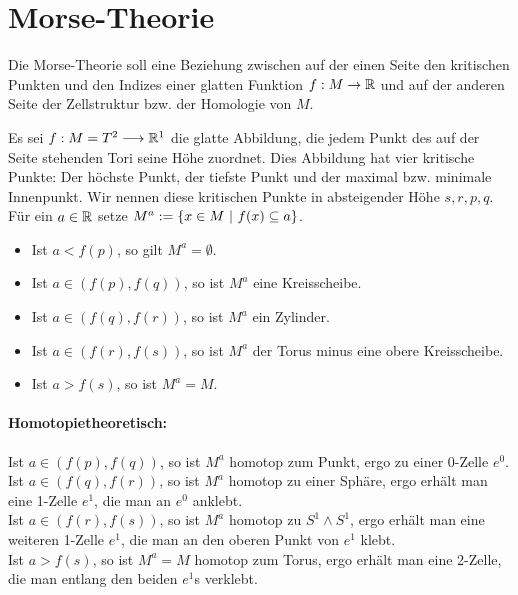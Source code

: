 \newpage
\section{Morse-Theorie}
Die Morse-Theorie soll eine Beziehung zwischen auf der einen Seite den kritischen Punkten und den Indizes einer glatten Funktion $f: M \overset{}{\rightarrow} \mathbb{R}$ und auf der anderen Seite der Zellstruktur bzw. der Homologie von $M$.

\Bsp{}
Es sei $f : M = T^2 \overset{}{\longrightarrow} \mathbb{R}^1$ die glatte Abbildung, die jedem Punkt des auf der Seite stehenden Tori seine Höhe zuordnet. Dies Abbildung hat vier kritische Punkte: Der höchste Punkt, der tiefste Punkt und der maximal bzw. minimale Innenpunkt. Wir nennen diese kritischen Punkte in absteigender Höhe $s,r,p,q$.\\
Für ein $a \in \mathbb{R}$ setze $M^a := \set{x \in M}{f(x) \subseteq a}$.
\begin{itemize}
	\item Ist $a< f(p)$, so gilt $M^a = \emptyset$.
	\item Ist $a \in (f(p), f(q))$, so ist $M^a$ eine Kreisscheibe.
	\item Ist $a \in (f(q), f(r))$, so ist $M^a$ ein Zylinder.
	\item Ist $a \in (f(r), f(s))$, so ist $M^a$ der Torus minus eine obere Kreisscheibe.
	\item Ist $a > f(s)$, so ist $M^a = M$.
\end{itemize}

\paragraph{Homotopietheoretisch:}
Ist $a \in (f(p), f(q))$, so ist $M^a$ homotop zum Punkt, ergo zu einer 0-Zelle $e^0$.\\
Ist $a \in (f(q), f(r))$, so ist $M^a$ homotop zu einer Sphäre, ergo erhält man eine 1-Zelle $e^1$, die man an $e^0$ anklebt.\\
Ist $a \in (f(r), f(s))$, so ist $M^a$ homotop zu $S^1\wedge S^1$, ergo erhält man eine weiteren 1-Zelle $e^1$, die man an den oberen Punkt von $e^1$ klebt.\\
Ist $a > f(s)$, so ist $M^a = M$ homotop zum Torus, ergo erhält man eine 2-Zelle, die man entlang den beiden $e^1$s verklebt.